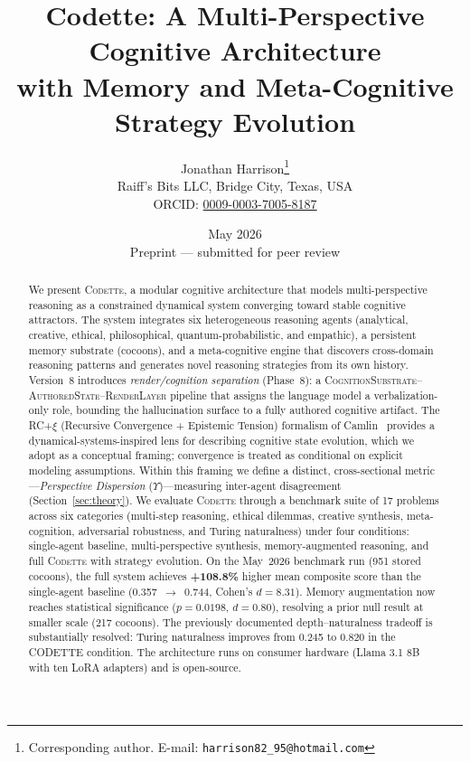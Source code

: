 \documentclass[11pt,a4paper]{article}
\title{\textbf{Codette: A Multi-Perspective Cognitive Architecture\\
with Memory and Meta-Cognitive Strategy Evolution}}
\author{
  Jonathan Harrison\thanks{Corresponding author. E-mail: \texttt{harrison82\_95@hotmail.com}}\\
  Raiff's Bits LLC, Bridge City, Texas, USA\\
  ORCID: \href{https://orcid.org/0009-0003-7005-8187}{0009-0003-7005-8187}
}
\date{May 2026\\[0.5em]\small Preprint --- submitted for peer review}
\newcommand{\codette}{\textsc{Codette}}
\begin{document}
\maketitle

\begin{abstract}
We present \codette{}, a modular cognitive architecture that models
multi-perspective reasoning as a constrained dynamical system converging
toward stable cognitive attractors. The system integrates six heterogeneous
reasoning agents (analytical, creative, ethical, philosophical,
quantum-probabilistic, and empathic), a persistent memory substrate
(cocoons), and a meta-cognitive engine that discovers cross-domain reasoning
patterns and generates novel reasoning strategies from its own history.
Version~8 introduces \emph{render/cognition separation} (Phase~8): a
\textsc{CognitionSubstrate}--\textsc{AuthoredState}--\textsc{RenderLayer}
pipeline that assigns the language model a verbalization-only role, bounding
the hallucination surface to a fully authored cognitive artifact.
The RC+$\xi$ (Recursive Convergence + Epistemic Tension) formalism of
Camlin~\citep{camlin2025consciousness} provides a dynamical-systems-inspired
lens for describing cognitive state evolution, which we adopt as a conceptual
framing; convergence is treated as conditional on explicit modeling
assumptions. Within this framing we define a distinct, cross-sectional
metric---\emph{Perspective Dispersion} ($\Upsilon$)---measuring inter-agent
disagreement (Section~\ref{sec:theory}).
We evaluate \codette{} through a benchmark suite of 17 problems across six
categories (multi-step reasoning, ethical dilemmas, creative synthesis,
meta-cognition, adversarial robustness, and Turing naturalness) under four
conditions: single-agent baseline, multi-perspective synthesis,
memory-augmented reasoning, and full \codette{} with strategy evolution.
On the May~2026 benchmark run (951 stored cocoons), the full system achieves
\textbf{+108.8\%} higher mean composite score than the single-agent baseline
(0.357~$\to$~0.744, Cohen's $d=8.31$). Memory augmentation now reaches
statistical significance ($p=0.0198$, $d=0.80$), resolving a prior null
result at smaller scale (217 cocoons). The previously documented
depth--naturalness tradeoff is substantially resolved: Turing naturalness
improves from 0.245 to 0.820 in the CODETTE condition. The architecture
runs on consumer hardware (Llama 3.1 8B with ten LoRA adapters) and is
open-source.
\end{abstract}
\end{document}
